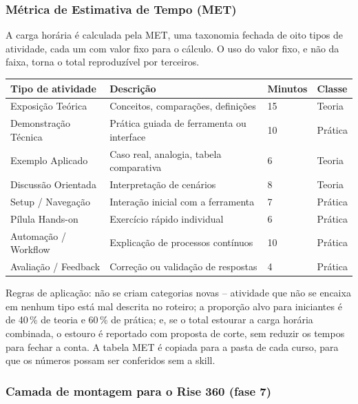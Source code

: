\documentclass[12pt,a4paper]{article}
\begin{document}
\subsubsection*{Métrica de Estimativa de Tempo (MET)}

A carga horária é calculada pela MET, uma taxonomia fechada de oito tipos de atividade, cada um com valor fixo para o cálculo. O uso do valor fixo, e não da faixa, torna o total reproduzível por terceiros.

\begingroup\small
\renewcommand{\arraystretch}{1.3}
\begin{longtable}{@{}L{0.30\textwidth}L{0.40\textwidth}C{0.10\textwidth}C{0.12\textwidth}@{}}
\toprule
\textbf{Tipo de atividade} & \textbf{Descrição} & \textbf{Minutos} & \textbf{Classe} \\
\midrule
\endhead
Exposição Teórica & Conceitos, comparações, definições & 15 & Teoria \\
Demonstração Técnica & Prática guiada de ferramenta ou interface & 10 & Prática \\
Exemplo Aplicado & Caso real, analogia, tabela comparativa & 6 & Teoria \\
Discussão Orientada & Interpretação de cenários & 8 & Teoria \\
Setup / Navegação & Interação inicial com a ferramenta & 7 & Prática \\
Pílula Hands-on & Exercício rápido individual & 6 & Prática \\
Automação / Workflow & Explicação de processos contínuos & 10 & Prática \\
Avaliação / Feedback & Correção ou validação de respostas & 4 & Prática \\
\bottomrule
\end{longtable}
\endgroup

Regras de aplicação: não se criam categorias novas -- atividade que não se encaixa em nenhum tipo está mal descrita no roteiro; a proporção alvo para iniciantes é de 40\,\% de teoria e 60\,\% de prática; e, se o total estourar a carga horária combinada, o estouro é reportado com proposta de corte, sem reduzir os tempos para fechar a conta. A tabela MET é copiada para a pasta de cada curso, para que os números possam ser conferidos sem a skill.

\subsubsection*{Camada de montagem para o Rise 360 (fase 7)}
\end{document}
